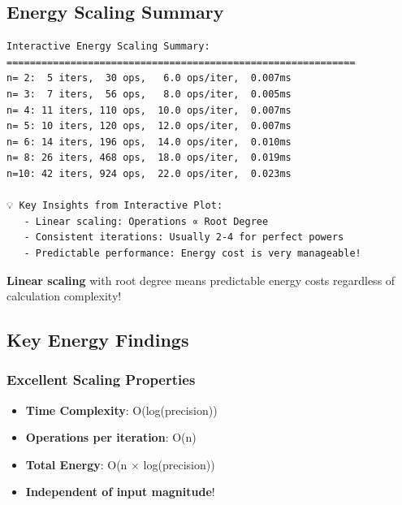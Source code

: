 \documentclass[
  letterpaper,
  DIV=11,
  numbers=noendperiod]{scrartcl}
\providecommand{\tightlist}{%
  \setlength{\itemsep}{0pt}\setlength{\parskip}{0pt}}
\begin{document}
\subsection{Energy Scaling Summary}\label{energy-scaling-summary}

\begin{verbatim}
Interactive Energy Scaling Summary:
============================================================
n= 2:  5 iters,  30 ops,   6.0 ops/iter,  0.007ms
n= 3:  7 iters,  56 ops,   8.0 ops/iter,  0.005ms
n= 4: 11 iters, 110 ops,  10.0 ops/iter,  0.007ms
n= 5: 10 iters, 120 ops,  12.0 ops/iter,  0.007ms
n= 6: 14 iters, 196 ops,  14.0 ops/iter,  0.010ms
n= 8: 26 iters, 468 ops,  18.0 ops/iter,  0.019ms
n=10: 42 iters, 924 ops,  22.0 ops/iter,  0.023ms

💡 Key Insights from Interactive Plot:
   - Linear scaling: Operations ∝ Root Degree
   - Consistent iterations: Usually 2-4 for perfect powers
   - Predictable performance: Energy cost is very manageable!
\end{verbatim}

\begin{tcolorbox}[enhanced jigsaw, rightrule=.15mm, colbacktitle=quarto-callout-tip-color!10!white, titlerule=0mm, toptitle=1mm, colframe=quarto-callout-tip-color-frame, bottomtitle=1mm, coltitle=black, arc=.35mm, breakable, title=\textcolor{quarto-callout-tip-color}{\faLightbulb}\hspace{0.5em}{Energy Efficiency Breakthrough!}, bottomrule=.15mm, toprule=.15mm, colback=white, left=2mm, opacityback=0, opacitybacktitle=0.6, leftrule=.75mm]

{\textbf{Linear scaling}} with root degree means predictable energy
costs regardless of calculation complexity!

\end{tcolorbox}

\subsection{Key Energy Findings}\label{key-energy-findings}

\subsubsection{\texorpdfstring{\textbf{Excellent Scaling
Properties}}{Excellent Scaling Properties}}\label{excellent-scaling-properties}

\begin{itemize}
\tightlist
\item
  \textbf{Time Complexity}: O(log(precision))
\item
  \textbf{Operations per iteration}: O(n)
\item
  \textbf{Total Energy}: O(n × log(precision))
\item
  \textbf{Independent of input magnitude}!
\end{itemize}
\end{document}
